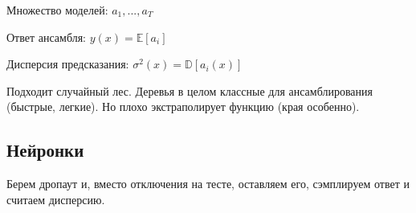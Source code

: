 Множество моделей: $a_1, ..., a_T$

Ответ ансамбля: $y(x) = \mathbb{E}[a_i]$

Дисперсия предсказания: $\sigma^2(x) = \mathbb{D}[a_i(x)]$

Подходит случайный лес. Деревья в целом классные для ансамблирования
(быстрые, легкие). Но плохо экстраполирует функцию (края особенно).

\subsection*{Нейронки}

Берем дропаут и, вместо отключения на тесте, оставляем его,
сэмплируем ответ и считаем дисперсию.


